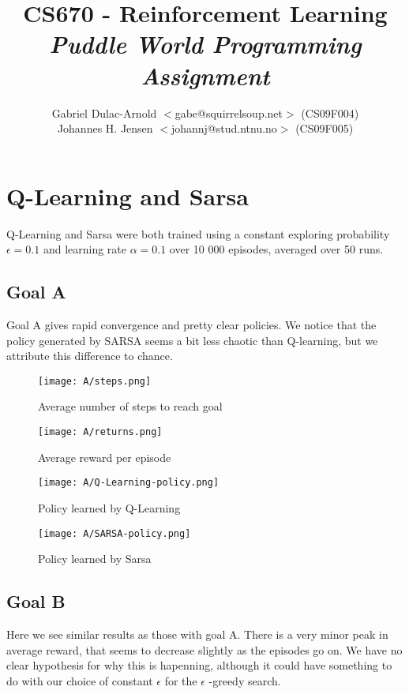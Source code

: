 \documentclass[a4paper]{article}
\author{Gabriel Dulac-Arnold $<$gabe@squirrelsoup.net$>$ (CS09F004) \\
Johannes H. Jensen $<$johannj@stud.ntnu.no$>$ (CS09F005)}
\title{CS670 - Reinforcement Learning \\
\emph{Puddle World Programming Assignment}}
\begin{document}
\setlength{\parskip}{2ex}
\maketitle

\section{Q-Learning and Sarsa}

Q-Learning and Sarsa were both trained using a constant exploring probability 
$\epsilon = 0.1$ and learning rate $\alpha = 0.1$ over 10 000 episodes, averaged
over 50 runs.

\subsection{Goal A}

Goal A gives rapid convergence and pretty clear policies.  We notice that the policy
generated by SARSA seems a bit less chaotic than Q-learning, but we attribute this difference
to chance.

\begin{figure}[htbp!]
\center
\texttt{[image: A/steps.png]}
\caption{Average number of steps to reach goal}
\end{figure}

\begin{figure}[htbp!]
\center
\texttt{[image: A/returns.png]}
\caption{Average reward per episode}
\end{figure}

\begin{figure}[htbp!]
\center
\texttt{[image: A/Q-Learning-policy.png]}
\caption{Policy learned by Q-Learning}
\end{figure}

\begin{figure}[htbp!]
\center
\texttt{[image: A/SARSA-policy.png]}
\caption{Policy learned by Sarsa}
\end{figure}

\newpage
\subsection{Goal B}

Here we see similar results as those with goal A.  There is a very minor peak in average reward,
that seems to decrease slightly as the episodes go on.  We have no clear hypothesis for why this is
hapenning, although it could have something to do with our choice of constant $\epsilon$ for the $\epsilon$
-greedy search.
\end{document}

